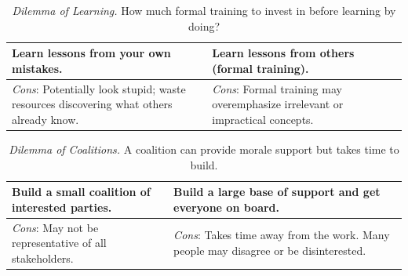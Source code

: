 \begin{center}
\begin{table}[H] %
\begin{tabular}{ | m{\dilemmatablewidth}| m{\dilemmatablewidth} | } 
  \hline
  \textbf{Learn lessons from your own mistakes.} & 
  \textbf{Learn lessons from others (formal training).} \\ 
  \hline
  \textit{Cons}: Potentially look stupid; waste resources discovering what others already know. & 
  \textit{Cons}: Formal training may overemphasize irrelevant or impractical concepts. \\  
  \hline
\end{tabular}
\caption{
\textit{Dilemma of Learning.}
How much formal training to invest in before learning by doing?
}
\label{table:dilemma-lessons-learned-source}
\end{table}
\end{center}



\begin{center}
\begin{table}[H] %
\begin{tabular}{ | m{\dilemmatablewidth}| m{\dilemmatablewidth} | } 
  \hline
  \textbf{Build a small coalition of interested parties.} & 
  \textbf{Build a large base of support and get everyone on board.} \\ 
  \hline
  \textit{Cons}: May not be representative of all stakeholders. & 
  \textit{Cons}: Takes time away from the work. Many people may disagree or be disinterested. \\  
  \hline
\end{tabular}
\caption{
\textit{Dilemma of Coalitions.}
A coalition can provide morale support but takes time to build.
}
\label{table:dilemma-how-to-change}
\end{table}
\end{center}

